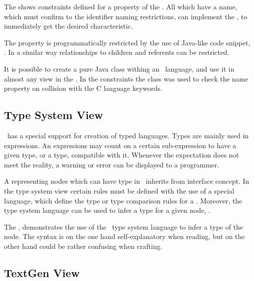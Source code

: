 
The  shows constraints defined for a property  of the  .
All  which have a name, which must confirm to the identifier naming restrictions, can implement the ,
to immediately get the desired characteristic.

The  property is programmatically restricted by the use of Java-like code snippet, . In a similar way
relationships to children and referents can be restricted.

It is possible to create a pure Java class withing an \jbmps\ language, and use it in almost any  view in the \jbmps. 
In the   constraints the  class was used to check the
name property on collision with the C language keywords.

\subsection{Type System View}
\jbmps\ has a special support for creation of typed languages. Types are mainly used in expressions. An expressions may count on 
a certain sub-expression to have a given type, or a type, compatible with it. Whenever the expectation does not meet the reality,
a warning or error can be displayed to a programmer. 


A  representing nodes which can have type in \mbdr\ inherits from  interface concept. In the type system view
certain rules must be defined with the use of a special language, which define the type or type comparison rules for a .
Moreover, the type system language can be used to infer a type for a given node, .

The , demonstrates the use of the \jbmps\ type system language to infer a type of the  
node. The syntax is on the one hand self-explanatory when reading, but on the other hand could be rather confusing when crafting.

\subsection{TextGen View}

